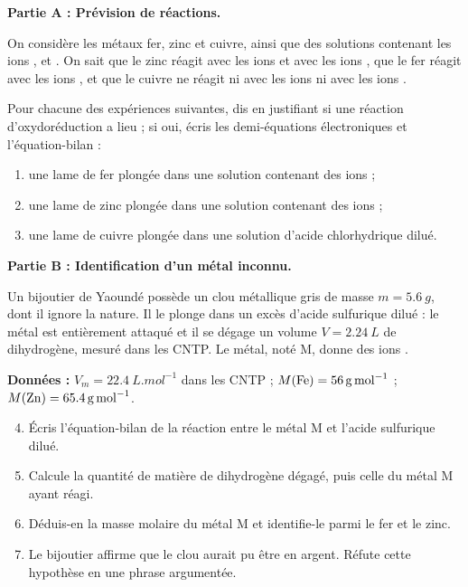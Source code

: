 \documentclass[11pt]{article}
\begin{document}
\begin{exercice}
\textbf{Partie A : Prévision de réactions.}

On considère les métaux fer, zinc et cuivre, ainsi que des solutions contenant les ions ,  et . On sait que le zinc réagit avec les ions  et avec les ions , que le fer réagit avec les ions , et que le cuivre ne réagit ni avec les ions  ni avec les ions .

Pour chacune des expériences suivantes, dis en justifiant si une réaction d'oxydoréduction a lieu ; si oui, écris les demi-équations électroniques et l'équation-bilan :
\begin{enumerate}
\item une lame de fer plongée dans une solution contenant des ions  ;
\item une lame de zinc plongée dans une solution contenant des ions  ;
\item une lame de cuivre plongée dans une solution d'acide chlorhydrique dilué.
\end{enumerate}

\textbf{Partie B : Identification d'un métal inconnu.}

Un bijoutier de Yaoundé possède un clou métallique gris de masse $m = \SI{5,6}{g}$, dont il ignore la nature. Il le plonge dans un excès d'acide sulfurique dilué : le métal est entièrement attaqué et il se dégage un volume $V = \SI{2,24}{L}$ de dihydrogène, mesuré dans les CNTP. Le métal, noté M, donne des ions .

\textbf{Données :} $V_m = \SI{22,4}{L.mol^{-1}}$ dans les CNTP ; $M(\ce{Fe}) = \SI{56}{g.mol^{-1}}$ ; $M(\ce{Zn}) = \SI{65,4}{g.mol^{-1}}$.

\begin{enumerate}
\setcounter{enumi}{3}
\item Écris l'équation-bilan de la réaction entre le métal M et l'acide sulfurique dilué.
\item Calcule la quantité de matière de dihydrogène dégagé, puis celle du métal M ayant réagi.
\item Déduis-en la masse molaire du métal M et identifie-le parmi le fer et le zinc.
\item Le bijoutier affirme que le clou aurait pu être en argent. Réfute cette hypothèse en une phrase argumentée.
\end{enumerate}
\end{exercice}
\end{document}
